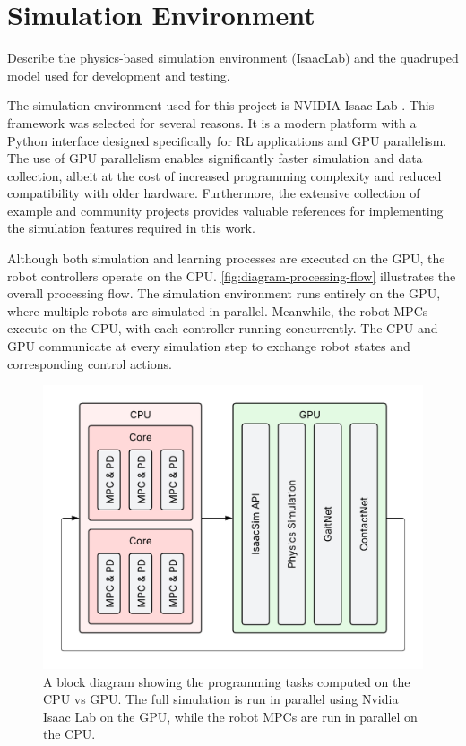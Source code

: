 \section{Simulation Environment}
\label{sec:methodology-simulation-environment}

\begin{outline}
  Describe the physics-based simulation environment (IsaacLab) and
  the quadruped model used for development and testing.
\end{outline}

The simulation environment used for this project is NVIDIA Isaac Lab
\cite{mittal_orbit_2023}. This framework was selected for several
reasons. It is a modern platform with a Python interface designed
specifically for RL applications and GPU parallelism. The use of GPU
parallelism enables significantly faster simulation and data
collection, albeit at the cost of increased programming complexity
and reduced compatibility with older hardware. Furthermore, the
extensive collection of example and community projects provides
valuable references for implementing the simulation features required
in this work.

Although both simulation and learning processes are executed on the
GPU, the robot controllers operate on the CPU.
\autoref{fig:diagram-processing-flow} illustrates the overall
processing flow. The simulation environment runs entirely on the GPU,
where multiple robots are simulated in parallel. Meanwhile, the robot
MPCs execute on the CPU, with each controller running concurrently.
The CPU and GPU communicate at every simulation step to exchange
robot states and corresponding control actions.

\begin{figure}[H]
  \centering
  \includegraphics[width=0.5\linewidth]{images/diagrams/processing-flow.png}
  \caption{A block diagram showing the programming tasks computed on
    the CPU vs GPU. The full simulation is run in parallel using Nvidia
  Isaac Lab on the GPU, while the robot MPCs are run in parallel on the CPU.}
  \label{fig:diagram-processing-flow}
\end{figure}

